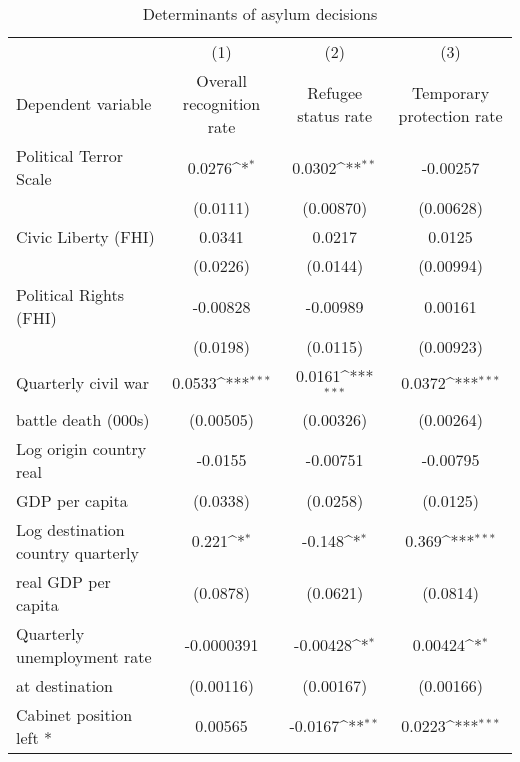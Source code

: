 \begin{table}[!ht]\centering \scriptsize
	\def\sym#1{\ifmmode^{#1}\else\(^{#1}\)\fi}
	\caption{Determinants of asylum decisions}
	\begin{tabular}{l*{3}{c}}
		\hline\hline
		                    &\multicolumn{1}{c}{(1)}&\multicolumn{1}{c}{(2)}&\multicolumn{1}{c}{(3)}\\
		Dependent variable                    &\multicolumn{1}{c}{Overall recognition rate}&\multicolumn{1}{c}{Refugee status rate}&\multicolumn{1}{c}{Temporary protection rate}\\
\hline
Political Terror Scale&      0.0276\sym{*}  &      0.0302\sym{**} &    -0.00257         \\
                    &    (0.0111)         &   (0.00870)         &   (0.00628)         \\
[0,5em]
Civic Liberty (FHI) &      0.0341         &      0.0217         &      0.0125         \\
                    &    (0.0226)         &    (0.0144)         &   (0.00994)         \\
[0,5em]
Political Rights (FHI)&    -0.00828         &    -0.00989         &     0.00161         \\
                    &    (0.0198)         &    (0.0115)         &   (0.00923)         \\
[0,5em]
Quarterly civil war &      0.0533\sym{***}&      0.0161\sym{***}&      0.0372\sym{***}\\
battle death (000s)                    &   (0.00505)         &   (0.00326)         &   (0.00264)         \\
[0,5em]
Log origin country real &     -0.0155         &    -0.00751         &    -0.00795         \\
GDP per capita                    &    (0.0338)         &    (0.0258)         &    (0.0125)         \\
[0,5em]
Log destination country quarterly &       0.221\sym{*}  &      -0.148\sym{*}  &       0.369\sym{***}\\
real GDP per capita                    &    (0.0878)         &    (0.0621)         &    (0.0814)         \\
[0,5em]
Quarterly unemployment rate &  -0.0000391         &    -0.00428\sym{*}  &     0.00424\sym{*}  \\
at destination                    &   (0.00116)         &   (0.00167)         &   (0.00166)         \\
[0,5em]
Cabinet position left * &     0.00565         &     -0.0167\sym{**} &      0.0223\sym{***}\\

\end{tabular}
\end{table}
